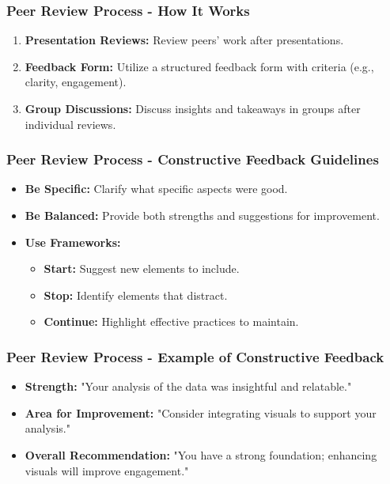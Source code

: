 \documentclass[aspectratio=169]{beamer}
\begin{document}
\begin{frame}[fragile]
    \frametitle{Peer Review Process - How It Works}
    \begin{enumerate}
        \item \textbf{Presentation Reviews:} 
            Review peers' work after presentations.
        \item \textbf{Feedback Form:} 
            Utilize a structured feedback form with criteria (e.g., clarity, engagement).
        \item \textbf{Group Discussions:} 
            Discuss insights and takeaways in groups after individual reviews.
    \end{enumerate}
\end{frame}

\begin{frame}[fragile]
    \frametitle{Peer Review Process - Constructive Feedback Guidelines}
    \begin{itemize}
        \item \textbf{Be Specific:} 
            Clarify what specific aspects were good.
        \item \textbf{Be Balanced:} 
            Provide both strengths and suggestions for improvement.
        \item \textbf{Use Frameworks:} 
            \begin{itemize}
                \item \textbf{Start:} Suggest new elements to include.
                \item \textbf{Stop:} Identify elements that distract.
                \item \textbf{Continue:} Highlight effective practices to maintain.
            \end{itemize}
    \end{itemize}
\end{frame}

\begin{frame}[fragile]
    \frametitle{Peer Review Process - Example of Constructive Feedback}
    \begin{itemize}
        \item \textbf{Strength:} 
            "Your analysis of the data was insightful and relatable."
        \item \textbf{Area for Improvement:} 
            "Consider integrating visuals to support your analysis."
        \item \textbf{Overall Recommendation:} 
            "You have a strong foundation; enhancing visuals will improve engagement."
    \end{itemize}
\end{frame}
\end{document}
